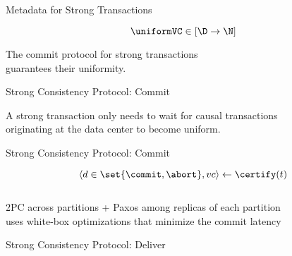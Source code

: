 \begin{frame}{Metadata for Strong Transactions}
  \begin{center}
    \[
      \uniformVC \in [\D \to \N]
    \]


    \vspace{0.30cm}
    The commit protocol for strong transactions \\[3pt]
    guarantees their uniformity.
  \end{center}
\end{frame}

\begin{frame}{Strong Consistency Protocol: Commit}
  \begin{center}

    \vspace{0.50cm}
    A strong transaction only needs to wait for causal transactions \\[3pt]
    originating at the  data center to become uniform.
    \vspace{0.30cm}

  \end{center}
\end{frame}

\begin{frame}{Strong Consistency Protocol: Commit}
  \begin{center}
    \vspace{-0.30cm}
    \[
      \langle d \in \set{\commit, \abort}, vc \rangle \gets \certify(t)
    \]

    \pause
    \begin{columns}
    \end{columns}

    \vspace{0.50cm}
    2PC across partitions + Paxos among replicas of each partition \\[3pt]
    uses white-box optimizations that minimize the commit latency
  \end{center}
\end{frame}

\begin{frame}{Strong Consistency Protocol: Deliver}
  \begin{center}
  \end{center}
\end{frame}
